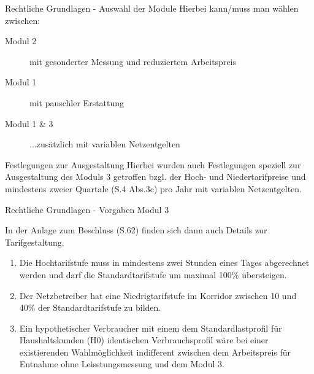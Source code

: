 \begin{frame}{Rechtliche Grundlagen - Auswahl der Module}
    Hierbei kann/muss man wählen zwischen:
    \begin{description}
        \item[Modul 2] mit gesonderter Messung und reduziertem Arbeitspreis
        \item[Modul 1] mit pauschler Erstattung
        \item[Modul 1 \& 3] ...zusätzlich mit variablen Netzentgelten
    \end{description} 
    \vspace{0.5cm}
    \begin{block}{Festlegungen zur Ausgestaltung}    
        Hierbei wurden auch Festlegungen speziell zur Ausgestaltung des Moduls 3 getroffen bzgl. der Hoch- und 
        Niedertarifpreise und mindestens zweier Quartale (S.4 Abs.3c) pro Jahr mit variablen Netzentgelten.
    \end{block}
\end{frame}

\begin{frame}{Rechtliche Grundlagen - Vorgaben Modul 3}
   
   In der Anlage zum Beschluss (S.62) finden sich dann auch Details zur Tarifgestaltung.

   \begin{enumerate}
      \item Die Hochtarifstufe muss in mindestens zwei Stunden eines Tages abgerechnet werden 
         und darf die Standardtarifstufe um maximal 100\% übersteigen.
      \item Der Netzbetreiber hat eine Niedrigtarifstufe im Korridor zwischen 10 und 40\% der 
         Standardtarifstufe zu bilden.
      \item Ein hypothetischer Verbraucher mit einem dem Standardlastprofil für 
         Haushaltskunden (H0) identischen Verbrauchsprofil wäre bei einer existierenden 
         Wahlmöglichkeit indifferent zwischen dem Arbeitspreis für Entnahme ohne 
         Leisstungsmessung und dem Modul 3.
   \end{enumerate}
\end{frame}

